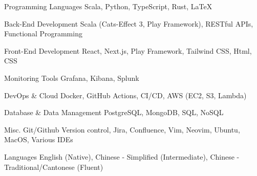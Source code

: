 
\begin{cvskills}

  \cvskill
  {Programming Languages} %
  {Scala, Python, TypeScript, Rust, LaTeX} %

  \cvskill
  {Back-End Development} %
  {Scala (Cats-Effect 3, Play Framework), RESTful APIs, Functional Programming} %

  \cvskill
  {Front-End Development} %
  {React, Next.js, Play Framework, Tailwind CSS, Html, CSS} %

\cvskill
  {Monitoring Tools} %
  {Grafana, Kibana, Splunk} %

  \cvskill
  {DevOps \& Cloud} %
  {Docker, GitHub Actions, CI/CD, AWS (EC2, S3, Lambda)} %

  \cvskill
  {Database \& Data Management} %
  {PostgreSQL, MongoDB, SQL, NoSQL} %

\cvskill
  {Misc.} %
  {Git/Github Version control, Jira, Confluence, Vim, Neovim, Ubuntu, MacOS, Various IDEs} %


  \cvskill
  {Languages} %
  {English (Native), Chinese - Simplified (Intermediate), Chinese - Traditional/Cantonese (Fluent)} %

\end{cvskills}
